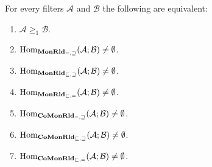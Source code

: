 \begin{thm}
For every filters $\mathcal{A}$ and $\mathcal{B}$ the following
are equivalent:
\begin{enumerate}
\item \label{ge1-ineq}$\mathcal{A}\ge_{1}\mathcal{B}$.
\item \label{ge1-eq-ge}$\operatorname{Hom}_{\mathbf{MonRld}_{=,\sqsupseteq}}(\mathcal{A};\mathcal{B})\ne\emptyset$.
\item \label{ge1-le-ge}$\operatorname{Hom}_{\mathbf{MonRld}_{\sqsubseteq,\sqsupseteq}}(\mathcal{A};\mathcal{B})\ne\emptyset$.
\item \label{ge1-le-eq}$\operatorname{Hom}_{\mathbf{MonRld}_{\sqsubseteq,=}}(\mathcal{A};\mathcal{B})\ne\emptyset$.
\item \label{g1-c-eq-ge}$\operatorname{Hom}_{\mathbf{CoMonRld}_{=,\sqsupseteq}}(\mathcal{A};\mathcal{B})\ne\emptyset$.
\item \label{g1-c-le-ge}$\operatorname{Hom}_{\mathbf{CoMonRld}_{\sqsubseteq,\sqsupseteq}}(\mathcal{A};\mathcal{B})\ne\emptyset$.
\item \label{g1-c-le-eq}$\operatorname{Hom}_{\mathbf{CoMonRld}_{\sqsubseteq,=}}(\mathcal{A};\mathcal{B})\ne\emptyset$.
\end{enumerate}
\end{thm}

